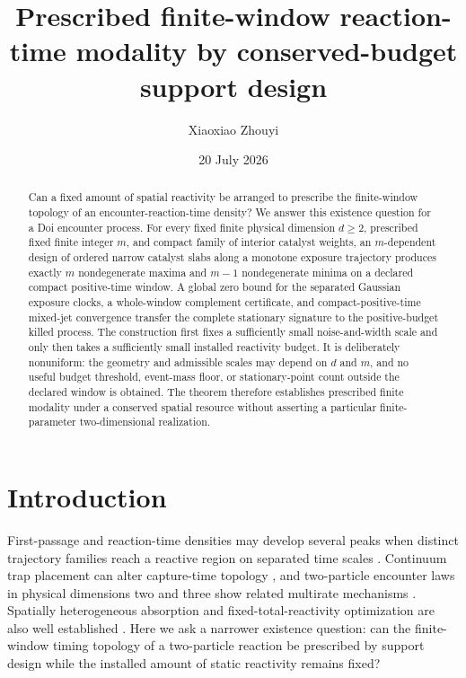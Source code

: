 \documentclass[aps,physrev,reprint,amsmath,amssymb,longbibliography,floatfix]{revtex4-2}
\begin{document}
\title{Prescribed finite-window reaction-time modality by conserved-budget support design}

\author{Xiaoxiao Zhouyi}

\date{20 July 2026}

\begin{abstract}
Can a fixed amount of spatial reactivity be arranged to prescribe the
finite-window topology of an encounter-reaction-time density?  We answer this
existence question for a Doi encounter process.  For every fixed finite
physical dimension \(d\ge2\), prescribed fixed finite integer \(m\), and
compact family of interior catalyst weights, an \(m\)-dependent design of
ordered narrow catalyst slabs along a monotone exposure trajectory produces
exactly \(m\) nondegenerate maxima and \(m-1\) nondegenerate minima on a
declared compact positive-time window.  A global zero bound for the separated
Gaussian exposure clocks, a whole-window complement certificate, and
compact-positive-time mixed-jet convergence transfer the complete stationary
signature to the positive-budget killed process.  The construction first
fixes a sufficiently small noise-and-width scale and only then takes a
sufficiently small installed reactivity budget.  It is deliberately
nonuniform: the geometry and admissible scales may depend on \(d\) and \(m\),
and no useful budget threshold, event-mass floor, or stationary-point count
outside the declared window is obtained.  The theorem therefore establishes
prescribed finite modality under a conserved spatial resource without
asserting a particular finite-parameter two-dimensional realization.
\end{abstract}

\maketitle

\section{Introduction}
\label{sec:introduction}

First-passage and reaction-time densities may develop several peaks when
distinct trajectory families reach a reactive region on separated time
scales \cite{godecMetzler2017twochannel,
grebenkovMetzlerOshanin2018defocusing}.  Continuum trap placement can alter
capture-time topology \cite{lindsaySpoonmoreTzou2016narrow}, and
two-particle encounter laws in physical dimensions two and three show related
multirate mechanisms \cite{leVotEtAl2022encounter,giuggioli2020confined,
giuggioliEtAl2024multitarget}.  Spatially heterogeneous absorption and
fixed-total-reactivity optimization are also well established
\cite{nguyenGrebenkov2010porous,grebenkov2019heterogeneous,
nicolaouMulder2023flux}.  Here we ask a narrower existence question: can the
finite-window timing topology of a two-particle reaction be prescribed by
support design while the installed amount of static reactivity remains fixed?
\end{document}
